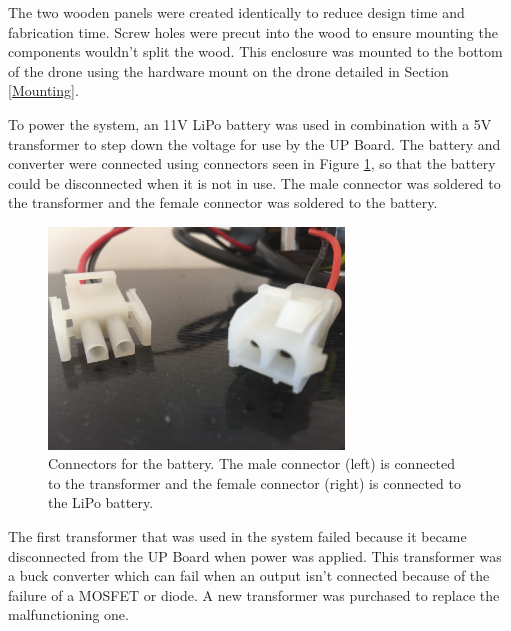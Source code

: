 The two wooden panels were created identically to reduce design time and fabrication time. Screw holes were precut into the wood to ensure mounting the components wouldn't split the wood. This enclosure was mounted to the bottom of the drone using the hardware mount on the drone detailed in Section \ref{Mounting}. \par

To power the system, an 11V LiPo battery was used in combination with a 5V transformer to step down the voltage for use by the UP Board. The battery and converter were connected using connectors seen in Figure \ref{fig:connectors}, so that the battery could be disconnected when it is not in use. The male connector was soldered to the transformer and the female connector was soldered to the battery.
\begin{figure}[ht!]
	\centering
	\includegraphics[width=0.70\textwidth]{img/connectors.JPG}
	\caption{Connectors for the battery. The male connector (left) is connected to the transformer and the female connector (right) is connected to the LiPo battery.}
	\label{fig:connectors}
\end{figure}\par
The first transformer that was used in the system failed because it became disconnected from the UP Board when power was applied. This transformer was a buck converter which can fail when an output isn't connected because of the failure of a MOSFET or diode. A new transformer was purchased to replace the malfunctioning one. \par

